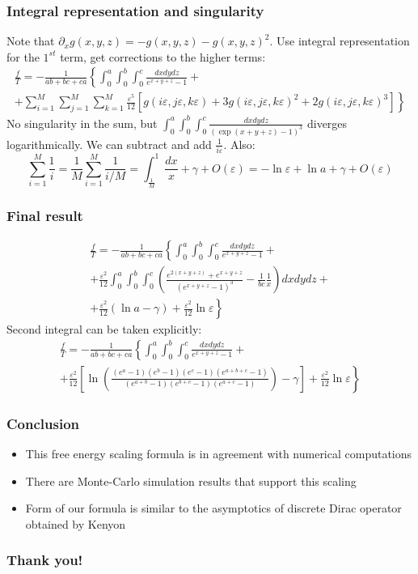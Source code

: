 \documentclass[pdftex]{beamer}
\theoremstyle{definition} \newtheorem{Def}{Definition}
\begin{document}
\begin{frame}
  \frametitle{Integral representation and singularity}
  Note that $\partial_{x}g(x,y,z)=-g(x,y,z)-g(x,y,z)^{2}$.
  Use integral representation for the $1^{st}$ term, get corrections to the higher terms:
  \begin{multline*}
    \frac{f}{T}=-\frac{1}{ab+bc+ca}\left\{\int_{0}^{a} \int_{0}^{b}\int_{0}^{c}\frac{dx dy dz}{e^{x+y+z}-1}+\right.\\
    \left.+\sum_{i=1}^{M}\sum_{j=1}^{M}\sum_{k=1}^{M}\frac{\varepsilon^{5}}{12}\left[g(i\varepsilon,j\varepsilon,k\varepsilon)+3 g(i\varepsilon,j\varepsilon,k\varepsilon)^{2}+2 g(i\varepsilon,j\varepsilon,k\varepsilon)^{3}\right]\right\}
  \end{multline*}
  No singularity in the sum, but $\int_{0}^{a} \int_{0}^{b}\int_{0}^{c}\frac{dx dy dz}{(\exp(x+y+z)-1)^{3}}$ diverges logarithmically.
  We can subtract and add $\frac{1}{i\varepsilon}$. Also:
  \begin{equation}
    \label{eq:24}
    \sum_{i=1}^{M}\frac{1}{i}=\frac{1}{M}\sum_{i=1}^{M}\frac{1}{i/M}=\int_{\frac{1}{M}}^{1}\frac{dx}{x}+\gamma+O(\varepsilon)=-\ln\varepsilon+\ln a+\gamma+O(\varepsilon)
  \end{equation}

\end{frame}
\begin{frame}
  \frametitle{Final result}
  \begin{multline*}
    \frac{f}{T}=-\frac{1}{ab+bc+ca}\left\{\int_{0}^{a} \int_{0}^{b}\int_{0}^{c}\frac{dx dy dz}{e^{x+y+z}-1}+\right.\\
    \left.+\frac{\varepsilon^{2}}{12}\int_{0}^{a} \int_{0}^{b}\int_{0}^{c}\left(\frac{e^{2(x+y+z)}+e^{x+y+z}}{\left(e^{x+y+z}-1\right)^{3}}-\frac{1}{bc}\frac{1}{x}\right)dx dy dz+\right.\\
    \left.+\frac{\varepsilon^{2}}{12}(\ln a-\gamma)+\frac{\varepsilon^{2}}{12}\ln \varepsilon\right\}    
  \end{multline*}
  Second integral can be taken explicitly:
  \begin{multline*}
    \frac{f}{T}=-\frac{1}{ab+bc+ca}\left\{\int_{0}^{a} \int_{0}^{b}\int_{0}^{c}\frac{dx dy dz}{e^{x+y+z}-1}+\right.\\
    \left.+\frac{\varepsilon^{2}}{12}\left[\ln\left(\frac{(e^{a}-1)(e^{b}-1)(e^{c}-1)(e^{a+b+c}-1)}{(e^{a+b}-1)(e^{b+c}-1)(e^{a+c}-1)}\right)-\gamma\right]+\frac{\varepsilon^{2}}{12}\ln \varepsilon\right\}    
  \end{multline*}
\end{frame}
\begin{frame}
  \frametitle{Conclusion}
  \begin{itemize}
  \item This free energy scaling formula is in agreement with numerical computations
  \item There are Monte-Carlo simulation results that support this scaling
  \item Form of our formula is similar to the asymptotics of discrete Dirac operator obtained by Kenyon
  \end{itemize}
\end{frame}

\begin{frame}
  \frametitle{Thank you!}
\end{frame}
\end{document}
